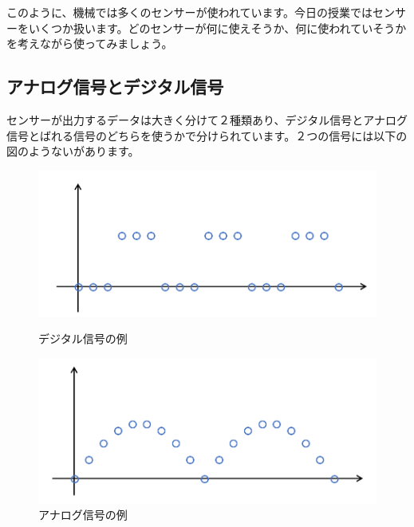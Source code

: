 このように、機械では多くのセンサーが使われています。今日の授業ではセンサーをいくつか扱います。どのセンサーが何に使えそうか、何に使われていそうかを考えながら使ってみましょう。

\begin{tcolorbox}[title=\useOmetoi]
\begin{enumerate}
\end{enumerate}
\end{tcolorbox}
\begin{tcolorbox}[title=\useOmetoi]
\begin{enumerate}
\end{enumerate}
\end{tcolorbox}

\subsection{アナログ信号とデジタル信号}
センサーが出力するデータは大きく分けて２種類あり、デジタル信号とアナログ信号とばれる信号のどちらを使うかで分けられています。２つの信号には以下の図のようないがあります。

\begin{figure}[htbp]
  \begin{minipage}[b]{0.45\linewidth}
    \centering
    \includegraphics[keepaspectratio, scale=0.4]{images/chap05/text05-img002.png}
    \caption{デジタル信号の例}
    \label{fig2}
  \end{minipage}
  \begin{minipage}[b]{0.45\linewidth}
    \centering
    \includegraphics[keepaspectratio, scale=0.4]{images/chap05/text05-img003.png}
    \caption{アナログ信号の例}
    \label{fig3}
  \end{minipage}
\end{figure}

